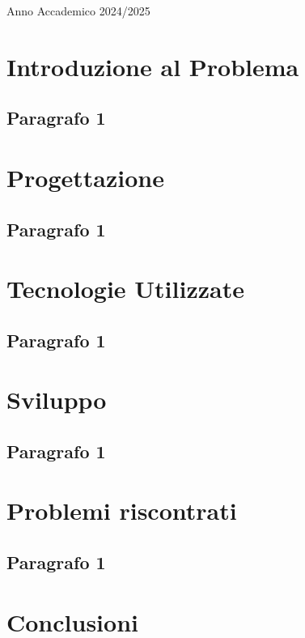 \documentclass[14pt]{extbook}
\begin{document}
\begin{center}
    \large{Anno Accademico 2024/2025}
\end{center}
\newpage

\tableofcontents
\pagestyle{plain}


\chapter{Introduzione al Problema}
\section{Paragrafo 1}

\chapter{Progettazione}
\section{Paragrafo 1}

\chapter{Tecnologie Utilizzate}
\section{Paragrafo 1}

\chapter{Sviluppo}
\section{Paragrafo 1}

\chapter{Problemi riscontrati}
\section{Paragrafo 1}

\chapter{Conclusioni}
\end{document}
